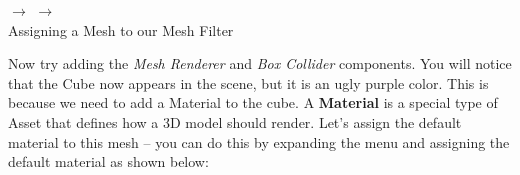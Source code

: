 \documentclass[11pt]{article}
\begin{document}
\begin{center}
\centering \noindent
{} $\rightarrow$
 $\rightarrow$
 \\
Assigning a Mesh to our Mesh Filter
\end{center}

Now try adding the \textit{Mesh Renderer} and \textit{Box Collider} components.  You will notice that the Cube now appears in the scene, but it is an ugly purple color.  This is because we need to add a Material to the cube.  A \textbf{Material} is a special type of Asset that defines how a 3D model should render.  Let's assign the default material to this mesh -- you can do this by expanding the  menu and assigning the default material as shown below:
\end{document}
